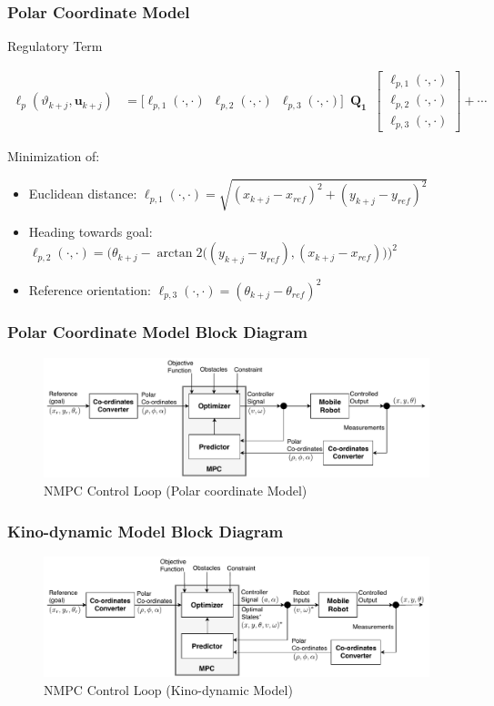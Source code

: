 	\begin{frame}
		\frametitle{Polar Coordinate Model}
		\begin{block}{Regulatory Term}
			\parbox[c][4\baselineskip][t]{\textwidth}{
			\begin{align*}
				\ell_p (\vartheta_{k + j},\mathbf{u}_{k + j}) &= 
				\pmb{[} \ell_{p,1}(\cdot,\cdot) \enspace \ell_{p,2}(\cdot,\cdot) \enspace \ell_{p,3}(\cdot,\cdot) \pmb{]}
				\enspace
				\mathbf{Q_1} \enspace
				\begin{bmatrix}
					\ell_{p,1}(\cdot,\cdot) \\
					\ell_{p,2}(\cdot,\cdot) \\
					\ell_{p,3}(\cdot,\cdot)
				\end{bmatrix}
				+ \cdots
			\end{align*}
			}
		\end{block}
		Minimization of:
		\begin{itemize}
			\item Euclidean distance: $\ell_{p,1}(\cdot,\cdot) = \sqrt{(x_{k+j} - x_{ref})^2+(y_{k+j} - y_{ref})^2}$
			\item Heading towards goal: $\ell_{p,2}(\cdot,\cdot) = \Big(\theta_{k+j} - \arctan2\big((y_{k+j} - y_{ref}),(x_{k+j} - x_{ref})\big)\Big)^2$
			\item Reference orientation: $\ell_{p,3}(\cdot,\cdot) = (\theta_{k+j} - \theta_{ref})^2$
		\end{itemize}
	\end{frame}

	\begin{frame}
		\frametitle{Polar Coordinate Model Block Diagram}
		\begin{figure}[hbtp]
			\centering
			\includegraphics[scale=0.64]{pictures/block_diagram_polar.pdf}
			\caption{NMPC Control Loop (Polar coordinate Model)}
		\end{figure}
	\end{frame}

	\begin{frame}
		\frametitle{Kino-dynamic Model Block Diagram}
		\begin{figure}[hbtp]
			\centering
			\includegraphics[scale=0.64]{pictures/block_diagram_kino.pdf}
			\caption{NMPC Control Loop (Kino-dynamic Model)}
		\end{figure}
	\end{frame}

